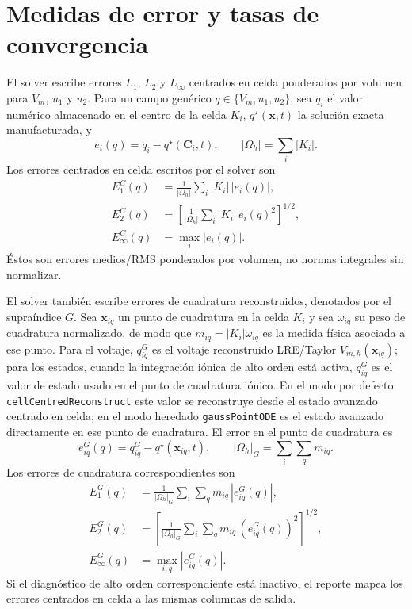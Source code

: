 \documentclass[11pt,a4paper]{article}
\newcommand{\code}[1]{\texttt{\small #1}}
\begin{document}
\section{Medidas de error y tasas de convergencia}
El solver escribe errores $L_1$, $L_2$ y $L_\infty$ centrados en celda ponderados por volumen
para $V_m$, $u_1$ y $u_2$. Para un campo genérico $q\in\{V_m,u_1,u_2\}$, sea $q_i$ el valor
numérico almacenado en el centro de la celda $K_i$, $q^\star(\mathbf{x},t)$ la solución exacta
manufacturada, y
\begin{equation}
  e_i(q)=q_i-q^\star(\mathbf{C}_i,t),
  \qquad
  |\Omega_h|=\sum_i |K_i|.
\end{equation}
Los errores centrados en celda escritos por el solver son
\begin{align}
  E_{1}^{C}(q)
  &=
  \frac{1}{|\Omega_h|}
  \sum_i |K_i|\,|e_i(q)|,
  \label{eq:cell-l1-error}
  \\
  E_{2}^{C}(q)
  &=
  \left[
  \frac{1}{|\Omega_h|}
  \sum_i |K_i|\,e_i(q)^2
  \right]^{1/2},
  \label{eq:cell-l2-error}
  \\
  E_{\infty}^{C}(q)
  &=
  \max_i |e_i(q)|.
  \label{eq:cell-linf-error}
\end{align}
Éstos son errores medios/RMS ponderados por volumen, no normas integrales sin normalizar.

El solver también escribe errores de cuadratura reconstruidos, denotados por el supraíndice
$G$. Sea $\mathbf{x}_{iq}$ un punto de cuadratura en la celda $K_i$ y sea $\omega_{iq}$ su peso
de cuadratura normalizado, de modo que $m_{iq}=|K_i|\omega_{iq}$ es la medida física asociada
a ese punto. Para el voltaje, $q^G_{iq}$ es el voltaje reconstruido LRE/Taylor
$V_{m,h}(\mathbf{x}_{iq})$; para los estados, cuando la integración iónica de alto orden está
activa, $q^G_{iq}$ es el valor de estado usado en el punto de cuadratura iónico. En el modo por
defecto \code{cellCentredReconstruct} este valor se reconstruye desde el estado avanzado
centrado en celda; en el modo heredado \code{gaussPointODE} es el estado avanzado directamente
en ese punto de cuadratura. El error en el punto de cuadratura es
\begin{equation}
  e_{iq}^{G}(q)=q^G_{iq}-q^\star(\mathbf{x}_{iq},t),
  \qquad
  |\Omega_h|_G=\sum_i\sum_q m_{iq}.
\end{equation}
Los errores de cuadratura correspondientes son
\begin{align}
  E_{1}^{G}(q)
  &=
  \frac{1}{|\Omega_h|_G}
  \sum_i\sum_q m_{iq}\,|e_{iq}^{G}(q)|,
  \label{eq:gauss-l1-error}
  \\
  E_{2}^{G}(q)
  &=
  \left[
  \frac{1}{|\Omega_h|_G}
  \sum_i\sum_q m_{iq}\,\left(e_{iq}^{G}(q)\right)^2
  \right]^{1/2},
  \label{eq:gauss-l2-error}
  \\
  E_{\infty}^{G}(q)
  &=
  \max_{i,q} |e_{iq}^{G}(q)|.
  \label{eq:gauss-linf-error}
\end{align}
Si el diagnóstico de alto orden correspondiente está inactivo, el reporte mapea los errores
centrados en celda a las mismas columnas de salida.
\end{document}

